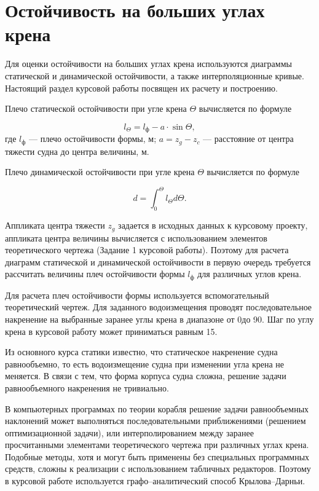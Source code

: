 \section{Остойчивость на больших углах крена}

Для оценки остойчивости на больших углах крена используются диаграммы статической и динамической остойчивости, а также интерполяционные кривые.
Настоящий раздел курсовой работы посвящен их расчету и построению.

Плечо статической остойчивости при угле крена $\Theta$ вычисляется по формуле

\begin{equation}
    l_{\Theta} = l_{\text{ф}} - a \cdot \sin \Theta,
\end{equation}
где
$l_{\text{ф}}$ --- плечо остойчивости формы, м;
$a = z_g - z_c$ --- расстояние от центра тяжести судна до центра величины, м.

Плечо динамической остойчивости при угле крена $\Theta$ вычисляется по формуле

\begin{equation}
    d = \int_0^{\Theta} l_{\Theta} d\Theta .
\end{equation}

Аппликата центра тяжести $z_g$ задается в исходных данных к курсовому проекту, аппликата центра величины вычисляется с использованием элементов теоретического чертежа (Задание 1 курсовой работы).
Поэтому для расчета диаграмм статической и динамической остойчивости в первую очередь требуется рассчитать величины плеч остойчивости формы $l_{\text{ф}}$ для различных углов крена.

Для расчета плеч остойчивости формы используется вспомогательный теоретический чертеж.
Для заданного водоизмещения проводят последовательное накренение на выбранные заранее углы крена в диапазоне от 0\textdegree до 90\textdegree.
Шаг по углу крена в курсовой работу может приниматься равным 15\textdegree.

Из основного курса статики известно, что статическое накренение судна равнообъемно, то есть водоизмещение судна при изменении угла крена не меняется.
В связи с тем, что форма корпуса судна сложна, решение задачи равнообъемного накренения не тривиально.

В компьютерных программах по теории корабля решение задачи равнообъемных наклонений может выполняться последовательными приближениями (решением оптимизационной задачи), или интерполированием между заранее просчитанными элементами теоретического чертежа при различных углах крена.
Подобные методы, хотя и могут быть применены без специальных программных средств, сложны к реализации с использованием табличных редакторов.
Поэтому в курсовой работе используется графо–аналитический способ Крылова–Дарньи.

